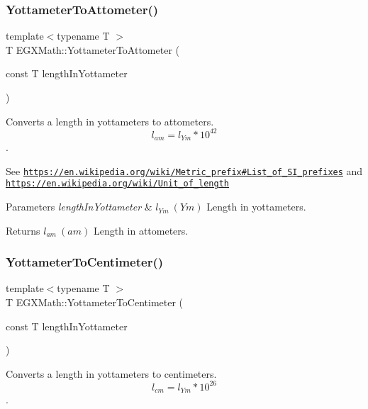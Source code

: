\subsubsection{\texorpdfstring{Yottameter\+To\+Attometer()}{YottameterToAttometer()}}
{\footnotesize\ttfamily template$<$typename T $>$ \\
T E\+G\+X\+Math\+::\+Yottameter\+To\+Attometer (\begin{DoxyParamCaption}\item[{const T}]{length\+In\+Yottameter }\end{DoxyParamCaption})}



Converts a length in yottameters to attometers. \[ l_{am}=l_{Ym} * 10^{42} \]. 

See \href{https://en.wikipedia.org/wiki/Metric_prefix#List_of_SI_prefixes}{\tt https\+://en.\+wikipedia.\+org/wiki/\+Metric\+\_\+prefix\#\+List\+\_\+of\+\_\+\+S\+I\+\_\+prefixes} and \href{https://en.wikipedia.org/wiki/Unit_of_length}{\tt https\+://en.\+wikipedia.\+org/wiki/\+Unit\+\_\+of\+\_\+length} 
\begin{DoxyParams}{Parameters}
{\em length\+In\+Yottameter} & $ l_{Ym}\ (Ym)$ Length in yottameters. \\
\hline
\end{DoxyParams}
\begin{DoxyReturn}{Returns}
$ l_{am}\ (am)$ Length in attometers. 
\end{DoxyReturn}
\mbox{\label{group___e_g_x_math-_conversions-_length_conversions-_yottameter-_s_i_ga29b512ac5c39f960b5f705cfb9bfe226}} 
\subsubsection{\texorpdfstring{Yottameter\+To\+Centimeter()}{YottameterToCentimeter()}}
{\footnotesize\ttfamily template$<$typename T $>$ \\
T E\+G\+X\+Math\+::\+Yottameter\+To\+Centimeter (\begin{DoxyParamCaption}\item[{const T}]{length\+In\+Yottameter }\end{DoxyParamCaption})}



Converts a length in yottameters to centimeters. \[ l_{cm}=l_{Ym} * 10^{26} \]. 

